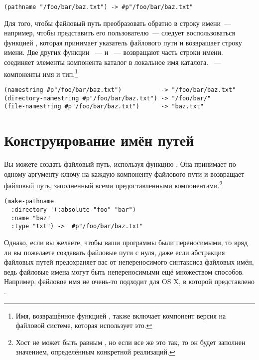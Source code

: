 \begin{lstlisting}
(pathname "/foo/bar/baz.txt") -> #p"/foo/bar/baz.txt" 
\end{lstlisting}

Для того, чтобы файловый путь преобразовать обратно в строку имени~--- например, чтобы
представить его пользователю~--- следует воспользоваться функцией ,
которая принимает указатель файлового пути и возвращает строку имени. Две других функции
~---  и ~--- возвращают часть строки
имени.  соединяет элементы компонента каталог в локальное имя
каталога. ~--- компоненты имя и тип.\footnote{Имя, возвращённое
  функцией , также включает компонент версия на файловой системе,
  которая использует это.}

\begin{lstlisting}
(namestring #p"/foo/bar/baz.txt")           -> "/foo/bar/baz.txt" 
(directory-namestring #p"/foo/bar/baz.txt") -> "/foo/bar/" 
(file-namestring #p"/foo/bar/baz.txt")      -> "baz.txt" 
\end{lstlisting}

\section{Конструирование имён путей}

Вы можете создать файловый путь, используя функцию . Она принимает по
одному аргументу-ключу на каждую компоненту файлового пути и возвращает файловый путь,
заполненный всеми предоставленными компонентами.\footnote{Хост не может быть равным
  , но если все же это так, то он будет заполнен значением, определённым
  конкретной реализаций.}

\begin{lstlisting}
(make-pathname
  :directory '(:absolute "foo" "bar")
  :name "baz"
  :type "txt") ->  #p"/foo/bar/baz.txt"
\end{lstlisting}

Однако, если вы желаете, чтобы ваши программы были переносимыми, то вряд ли вы пожелаете
создавать файловые пути с нуля, даже если абстракция файловых путей предохраняет вас от
непереносимого синтаксиса файловых имён, ведь файловые имена могут быть непереносимыми ещё
множеством способов. Например, файловое имя  не очень-то
подходит для OS X, в которой  представлено .

